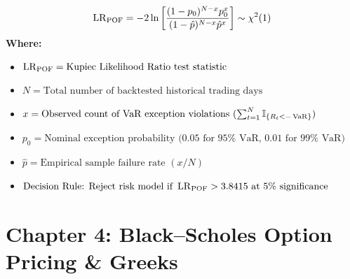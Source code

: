\begin{formulabox}
\begin{equation*}
\operatorname{LR}_{\operatorname{POF}} = -2 \ln \left[ \frac{(1 - p_0)^{N - x} p_0^x}{(1 - \hat{p})^{N - x} \hat{p}^x} \right] \sim \chi^2(1)
\end{equation*}
\textbf{Where:}
\begin{itemize}[leftmargin=1.8em, noitemsep]
    \item $\operatorname{LR}_{\operatorname{POF}} = \text{Kupiec Likelihood Ratio test statistic}$
    \item $N = \text{Total number of backtested historical trading days}$
    \item $x = \text{Observed count of VaR exception violations } (\sum_{t=1}^N \mathbb{I}_{\{R_t < -\operatorname{VaR}\}})$
    \item $p_0 = \text{Nominal exception probability ($0.05$ for } 95\% \text{ VaR, } 0.01 \text{ for } 99\% \text{ VaR)}$
    \item $\hat{p} = \text{Empirical sample failure rate } (x / N)$
    \item $\text{Decision Rule: Reject risk model if } \operatorname{LR}_{\operatorname{POF}} > 3.8415 \text{ at } 5\% \text{ significance}$
\end{itemize}
\end{formulabox}

\newpage
\section*{Chapter 4: Black--Scholes Option Pricing \& Greeks}


